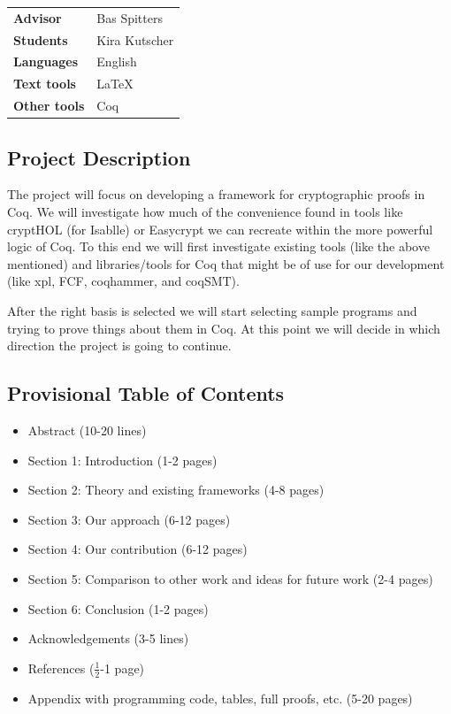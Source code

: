 \documentclass{article}
\begin{document}
\pagestyle{fancy}

\bgroup{}
\begin{table}[h]
\begin{tabular}{ll}
\textbf{Advisor}     & Bas Spitters     \\
\textbf{Students}    & Kira Kutscher    \\
\textbf{Languages}   & English          \\
\textbf{Text tools}  & \LaTeX           \\
\textbf{Other tools} & Coq              
\end{tabular}
\end{table}
\egroup\vspace{-0.cm}

\subsection*{Project Description}
The project will focus on developing a framework for cryptographic proofs in Coq. We
will investigate how much of the convenience found in tools like cryptHOL (for
Isablle) or Easycrypt we can recreate within the more powerful logic of Coq. To this
end we will first investigate existing tools (like the above mentioned) and libraries/tools
for Coq that might be of use for our development (like xpl, FCF, coqhammer, and
coqSMT).

After the right basis is selected we will start selecting sample programs and trying
to prove things about them in Coq. At this point we will decide in which direction
the project is going to continue. 


\subsection*{Provisional Table of Contents}
\begin{itemize}
    \item Abstract (10-20 lines)
    \item Section 1: Introduction (1-2 pages)
    \item Section 2: Theory and existing frameworks (4-8 pages)
    \item Section 3: Our approach (6-12 pages)
    \item Section 4: Our contribution (6-12 pages)
    \item Section 5: Comparison to other work and ideas for future work (2-4 pages)
    \item Section 6: Conclusion (1-2 pages)
    \item Acknowledgements (3-5 lines)
    \item References ($\frac{1}{2}$-1 page)
    \item Appendix with programming code, tables, full proofs, etc. (5-20 pages)
\end{itemize}
\end{document}
